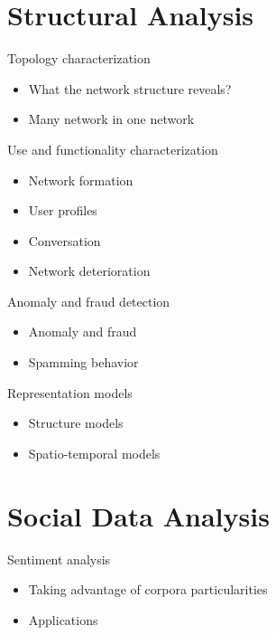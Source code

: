 \documentclass[8pt]{beamer}
\begin{document}
  \section{Structural Analysis}
  \begin{frame}{Topology characterization}
    \begin{itemize}
      \item What the network structure reveals?
      \item Many network in one network
    \end{itemize}
  \end{frame}

  \begin{frame}{Use and functionality characterization}
    \begin{itemize}
      \item Network formation
      \item User profiles
      \item Conversation
      \item Network deterioration
    \end{itemize}
  \end{frame}

  \begin{frame}{Anomaly and fraud detection}
    \begin{itemize}
      \item Anomaly and fraud
      \item Spamming behavior
    \end{itemize}
  \end{frame}

  \begin{frame}{Representation models}
    \begin{itemize}
      \item Structure models
      \item Spatio-temporal models
    \end{itemize}
  \end{frame}

  \section{Social Data Analysis}
  \begin{frame}{Sentiment analysis}
    \begin{itemize}
      \item Taking advantage of corpora particularities
      \item Applications
    \end{itemize}
  \end{frame}
\end{document}
